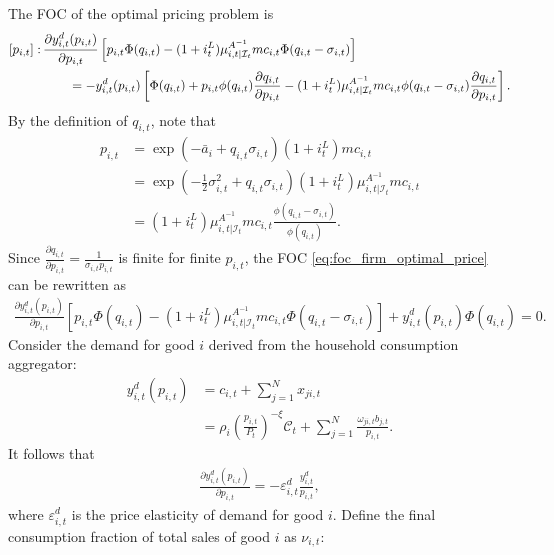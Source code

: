 \documentclass[12pt]{article}
\numberwithin{equation}{section}
\begin{document}
\begin{appendix}
The FOC of the optimal pricing problem is
\begin{align}\label{eq:foc_firm_optimal_price}
    [p_{i,t}]:\, &\frac{\partial y^d_{i,t}(p_{i,t})}{\partial p_{i,t}} \left[ p_{i,t}\Phi(q_{i,t}) - (1+i^L_t) \mu^{A^{-1}}_{i,t|\mathcal{I}_t} {mc}_{i,t} \Phi(q_{i,t} - \sigma_{i,t}) \right] \notag \\
    & \qquad = - y^d_{i,t}(p_{i,t}) \left[\Phi(q_{i,t})+ p_{i,t} \phi(q_{i,t})\frac{\partial q_{i,t}}{\partial p_{i,t}} - (1+i^L_t) \mu^{A^{-1}}_{i, t|\mathcal{I}_t} {mc}_{i,t} \phi(q_{i,t} - \sigma_{i,t}) \frac{\partial q_{i,t}}{\partial p_{i,t}}\right].
\end{align}
By the definition of $q_{i,t}$, note that
\begin{align*}
    p_{i,t} &= \exp \left(-\bar{a}_i + q_{i,t} \sigma_{i,t}\right) (1+i^L_t) {mc}_{i,t} \\
    &= \exp \left(-\frac12 \sigma^2_{i,t} + q_{i,t} \sigma_{i,t} \right) (1+i^L_t) \mu^{A^{-1}}_{i,t|\mathcal{I}_t} {mc}_{i,t}\\
    &= (1+i^L_t) \mu^{A^{-1}}_{i,t|\mathcal{I}_t} {mc}_{i,t} \frac{\phi(q_{i,t}-\sigma_{i,t})}{\phi(q_{i,t})}.
\end{align*}
Since $\frac{\partial q_{i,t}}{\partial p_{i,t}} = \frac{1}{\sigma_{i,t} p_{i,t}}$ is finite for finite $p_{i,t}$, the FOC \eqref{eq:foc_firm_optimal_price} can be rewritten as
\begin{align*}
    \frac{\partial y^d_{i,t}(p_{i,t})}{\partial p_{i,t}} \left[ p_{i,t}\Phi(q_{i,t}) - (1+i^L_t) \mu^{A^{-1}}_{i,t|\mathcal{I}_t} {mc}_{i,t} \Phi(q_{i,t} - \sigma_{i,t}) \right] + y^d_{i,t}(p_{i,t}) \Phi(q_{i,t}) = 0.
\end{align*}
Consider the demand for good $i$ derived from the household consumption aggregator: 
\begin{align*}
    y^d_{i,t}(p_{i,t}) &= c_{i,t} + \sum_{j=1}^N x_{ji,t}\\
    &= \rho_i \left(\frac{p_{i,t}}{P_t} \right)^{-\xi} \mathcal{C}_t + \sum_{j=1}^N\frac{\omega_{ji,t} b_{j,t}}{p_{i,t}}.
\end{align*}
It follows that 
\begin{align*}
    \frac{\partial y^d_{i,t}(p_{i,t})}{\partial p_{i,t}} = -\varepsilon^d_{i,t} \frac{y^d_{i,t}}{p_{i,t}},
\end{align*}
where $\varepsilon^d_{i,t}$ is the price elasticity of demand for good $i$. Define the final consumption fraction of total sales of good $i$ as $\nu_{i,t}$:
\begin{align*}

\end{align*}
\end{appendix}
\end{document}
